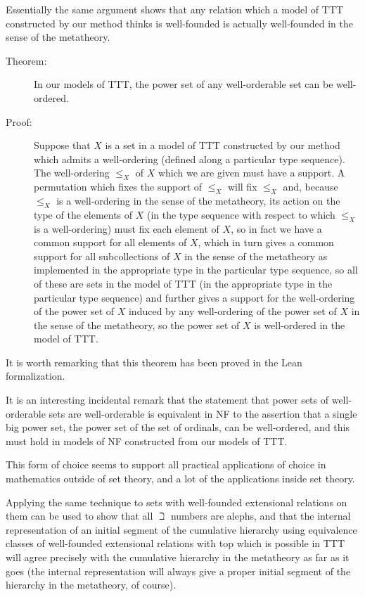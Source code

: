 \documentclass{article}
\theoremstyle{definition}
\theoremstyle{remark}
\begin{document}
{Essentially the same argument shows that any relation which a model of TTT constructed by our method thinks is well-founded is actually well-founded in the sense of the metatheory.

\begin{description}

\item[Theorem:]  In our models of TTT, the power set of any well-orderable set can be well-ordered.

\item[Proof:]  Suppose that $X$ is a set in a model of TTT constructed by our method which admits a well-ordering (defined along a particular type sequence).
The well-ordering $\leq_X$ of $X$ which we are given must have a support.  A permutation which fixes the support of $\leq_X$  will fix $\leq_X$ and, because $\leq_X$ is a well-ordering in the sense of the metatheory, its action on the type of the elements of $X$ (in the type sequence with respect to which $\leq_X$ is a well-ordering) must fix each element of $X$,
so in fact we have a common support for all elements of $X$, which in turn gives a common support for all subcollections of $X$ in the sense of the metatheory as implemented in the appropriate type in the particular type sequence, so all of these are sets in the model of TTT (in the appropriate type in the particular type sequence) and further gives a support for the well-ordering of the power set of $X$ induced by any well-ordering of the power set of $X$ in the sense of the metatheory, so the power set of $X$ is well-ordered in the model of TTT.


\end{description}


It is worth remarking that this theorem has been proved in the Lean formalization.

It is an interesting incidental remark that the statement that power sets of well-orderable sets are well-orderable is equivalent in NF to the assertion that a single big power set, the power set of the set of ordinals, can be well-ordered, and this must hold in models of NF constructed from our models of TTT.

This form of choice seems to support all practical applications of choice in mathematics outside of set theory, and a lot of the applications inside set theory.

Applying the same technique to sets with well-founded extensional relations on them can be used to show that all $\beth$ numbers are alephs, and that the internal representation of an initial segment of the cumulative hierarchy using equivalence classes of well-founded extensional relations with top which is possible in TTT will agree precisely with the cumulative hierarchy in the metatheory as far as it goes (the internal representation will always give a proper initial segment of the hierarchy in the metatheory, of course).

}
\end{document}
